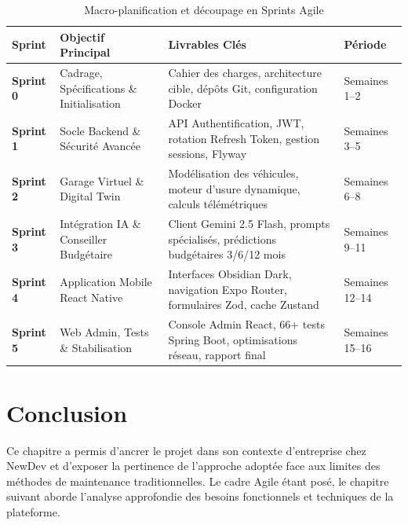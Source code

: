 \documentclass[12pt,a4paper,twoside,openright]{report}
\begin{document}
  \begin{table}[H]
  \centering
  \small
  \begin{tabularx}{\textwidth}{p{2.2cm} p{4.2cm} X p{2.2cm}}
  \toprule
  \textbf{Sprint} & \textbf{Objectif Principal} & \textbf{Livrables Cl\'es} & \textbf{P\'eriode} \\
  \midrule
  \textbf{Sprint 0} & Cadrage, Sp\'ecifications \& Initialisation & Cahier des charges, architecture cible, d\'ep\^ots Git, configuration Docker & Semaines 1--2 \\
  \addlinespace
  \textbf{Sprint 1} & Socle Backend \& S\'ecurit\'e Avanc\'ee & API Authentification, JWT, rotation Refresh Token, gestion sessions, Flyway & Semaines 3--5 \\
  \addlinespace
  \textbf{Sprint 2} & Garage Virtuel \& Digital Twin & Mod\'elisation des v\'ehicules, moteur d'usure dynamique, calculs t\'el\'em\'etriques & Semaines 6--8 \\
  \addlinespace
  \textbf{Sprint 3} & Int\'egration IA \& Conseiller Budg\'etaire & Client Gemini 2.5 Flash, prompts sp\'ecialis\'es, pr\'edictions budg\'etaires 3/6/12 mois & Semaines 9--11 \\
  \addlinespace
  \textbf{Sprint 4} & Application Mobile React Native & Interfaces Obsidian Dark, navigation Expo Router, formulaires Zod, cache Zustand & Semaines 12--14 \\
  \addlinespace
  \textbf{Sprint 5} & Web Admin, Tests \& Stabilisation & Console Admin React, 66+ tests Spring Boot, optimisations r\'eseau, rapport final & Semaines 15--16 \\
  \bottomrule
  \end{tabularx}
  \caption{Macro-planification et d\'ecoupage en Sprints Agile}
  \label{tab:sprints}
  \end{table}

  \section{Conclusion}
  Ce chapitre a permis d'ancrer le projet dans son contexte d'entreprise chez NewDev et d'exposer la pertinence de l'approche adopt\'ee face aux limites des m\'ethodes de maintenance traditionnelles. Le cadre Agile \'etant pos\'e, le chapitre suivant aborde l'analyse approfondie des besoins fonctionnels et techniques de la plateforme.

  \newpage

\end{document}
